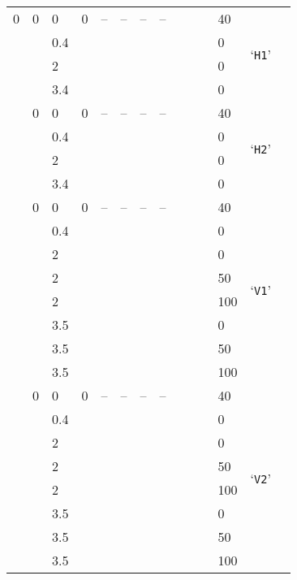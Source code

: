 \begin{longtable}{llll llll llll ll}
	0 & 0  &  \num{0} & 0 & -- & -- & -- & -- & \echaf{?} & \echaf{?} & \echaf{?} & 40 & \multirow{4}{*}{`\texttt{H1}'} \\*
	\echaf{?} & \echaf{?} &  \num{.4} & \echaf{?} & \echaf{?} & \echaf{?} & \echaf{?} & \echaf{?} & \echaf{?} & \echaf{?} & \echaf{?} & 0 &  \\*
	\echaf{?} & \echaf{?} &  \num{2} & \echaf{?} & \echaf{?} & \echaf{?} & \echaf{?} & \echaf{?} & \echaf{?} & \echaf{?} & \echaf{?} & 0 & \\*
	\echaf{?} & \echaf{?} &  \num{3.4} & \echaf{?} & \echaf{?} & \echaf{?} & \echaf{?} & \echaf{?} & \echaf{?} & \echaf{?} & \echaf{?} & 0 &  \\
	 \hdashline
	0 & 0 &  \num{0} & 0 & -- & -- & -- & -- &  &  &  & 40 & \multirow{4}{*}{`\texttt{H2}'} \\*
	 &  &  \num{.4} & & & &&& & \num{} & & 0 & \\*
	 &  &  \num{2} & & &&& & & \num{} & & 0 & \\*
	 &  &  \num{3.4} & & & &&& & \num{} & & 0 & \\
	 \hdashline
	0 & 0 &  \num{0} & 0 & -- & -- & -- & -- &  &  &  & 40 & \multirow{8}{*}{`\texttt{V1}'} \\*
	 &  &  \num{.4} & & & & &&& \num{} & & 0 & \\*
	 &  &  \num{2} &  & & &&& & \num{} & & 0 & \\*
	 &  &  \num{2} &  & & &&& & \num{} & & 50 & \\*
	 &  &  \num{2} &  & & &&& & \num{} & & 100 & \\*
	 &  &  \num{3.5} &  & & &&& & \num{} & & 0 & \\*
	 &  &  \num{3.5} &  & & &&& & \num{} & & 50 & \\*
	 &  &  \num{3.5} &  & & &&& & \num{} & & 100 & \\
	 \hdashline 
	0 & 0 &  \num{0} & 0 & -- & -- & -- & -- &  &  &  & 40 & \multirow{8}{*}{`\texttt{V2}'} \\*
	 &  &  \num{.4} & & && & && \num{} & & 0 & \\*
	 &  &  \num{2} & & & &&& & \num{} & & 0 & \\*
	 &  &  \num{2} & & & &&& & \num{} & & 50 & \\*
	 &  &  \num{2} & & & &&& & \num{} & & 100 & \\*
	 &  &  \num{3.5} &  & & & & \num{} & & & & 0 & \\*
	 &  &  \num{3.5} &  & & & & \num{} & & & & 50 & \\*
	 &  &  \num{3.5} &  & & & & \num{} & & & & 100 & \\*
\end{longtable}
	

